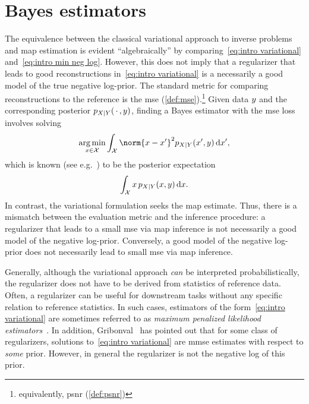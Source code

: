 \section{Bayes estimators}
The equivalence between the classical variational approach to inverse problems and \gls{map} estimation is evident \enquote{algebraically} by comparing~\cref{eq:intro variational} and~\cref{eq:intro min neg log}.
However, this does not imply that a regularizer that leads to good reconstructions in~\cref{eq:intro variational} is a necessarily a good model of the true negative log-prior.
The standard metric for comparing reconstructions to the reference is the \gls{mse} (\cref{def:mse}).\footnote{equivalently, \gls{psnr} (\cref{def:psnr})}
Given data \( y \) and the corresponding posterior \( p_{X \mid Y}(\,\cdot\,, y) \), finding a Bayes estimator with the \gls{mse} loss involves solving
\begin{equation}
	\argmin_{\Signal \in \mathcal{X}} \int_{\mathcal{X}} \norm{\Signal - \Signal^\prime}^{\num{2}} p_{X\mid Y}(\Signal^\prime, \Data)\,\mathrm{d}\Signal^\prime,
\end{equation}
which is known (see e.g.~\cite[page 172]{Jaynes_2003}) to be the posterior expectation
\begin{equation}
	\int_{\mathcal{X}} x\,p_{X \mid Y}(x, y)\,\mathrm{d}x.
\end{equation}
In contrast, the variational formulation seeks the \gls{map} estimate.
Thus, there is a mismatch between the evaluation metric and the inference procedure:
a regularizer that leads to a small \gls{mse} via \gls{map} inference is not necessarily a good model of the negative log-prior.
Conversely, a good model of the negative log-prior does not necessarily lead to small \gls{mse} via \gls{map} inference.

Generally, although the variational approach \emph{can} be interpreted probabilistically, the regularizer does not have to be derived from statistics of reference data.
Often, a regularizer can be useful for downstream tasks without any specific relation to reference statistics.
In such cases, estimators of the form~\cref{eq:intro variational} are sometimes referred to as \emph{maximum penalized likelihood estimators}~\cite{bohra_phdthesis,gribonval_penalized_2011}.
In addition, Gribonval~\cite{gribonval_penalized_2011} has pointed out that for some class of regularizers, solutions to~\cref{eq:intro variational} are \gls{mmse} estimates with respect to \emph{some} prior.
However, in general the regularizer is not the negative log of this prior.

